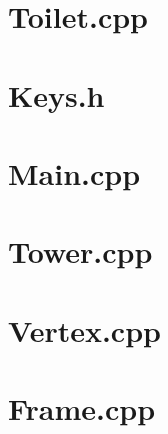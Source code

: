 \section{Toilet.cpp}

\pagebreak
\section{Keys.h}

\pagebreak
\section{Main.cpp}

\pagebreak
\section{Tower.cpp}

\pagebreak
\section{Vertex.cpp}

\pagebreak
\section{Frame.cpp}

\pagebreak
